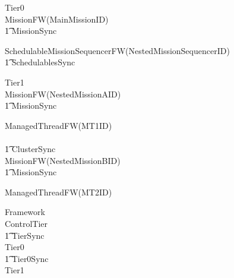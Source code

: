 \begin{circus}
\circprocess Tier0 \circdef \\

\circblockopen
	MissionFW(MainMissionID)\\
		\t1 	\lpar MissionSync \rpar \\
		\circblockopen









			SchedulableMissionSequencerFW(NestedMissionSequencerID)\\
\t1 \lpar SchedulablesSync \rpar\\



		\circblockclose
\circblockclose
\end{circus}
%
\begin{circus}
\circprocess Tier1 \circdef \\

\circblockopen
	MissionFW(NestedMissionAID)\\
		\t1 	\lpar MissionSync \rpar \\
		\circblockopen



			ManagedThreadFW(MT1ID)\\








		\circblockclose
\circblockclose
	\\ \t1 \lpar ClusterSync \rpar \\

\circblockopen
	MissionFW(NestedMissionBID)\\
		\t1 	\lpar MissionSync \rpar \\
		\circblockopen



			ManagedThreadFW(MT2ID)\\








		\circblockclose
\circblockclose
\end{circus}
%
%
%
\begin{circus}
\circprocess Framework \circdef \\
\circblockopen
ControlTier \\
\t1 \lpar TierSync \rpar \\
 \circblockopen
Tier0
\\ \t1 \lpar Tier0Sync \rpar \\
Tier1
\circblockclose
\circblockclose
\end{circus}
